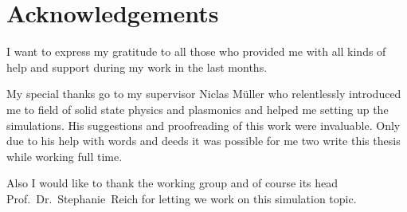 \section*{Acknowledgements}

I want to express my gratitude to all those who provided me with all kinds of
help and support during my work in the last months.

My special thanks go to my supervisor Niclas Müller who relentlessly introduced
me to field of solid state physics and plasmonics and helped me setting up the
simulations. His suggestions and proofreading of this work were invaluable. Only
due to his help with words and deeds it was possible for me two write this thesis
while working full time.

Also I would like to thank the working group and of course its head
Prof.~Dr.~Stephanie~Reich for letting we work on this simulation topic.
